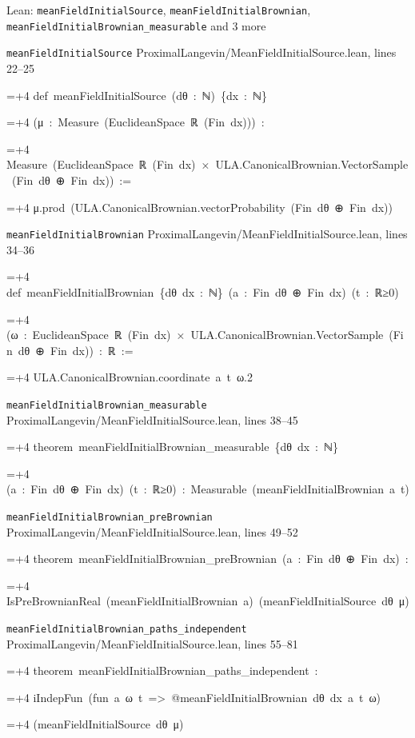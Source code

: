 \documentclass[11pt,a4paper]{report}
\newlength{\leancharwidth}
\newenvironment{leancode}{\par\smallskip\begingroup\ttfamily\footnotesize\raggedright
  \settowidth{\leancharwidth}{M}\setlength{\parskip}{0pt}\setlength{\parindent}{0pt}
  \frenchspacing}{\par\endgroup\smallskip}
\newcommand{\leanline}[2]{\hangindent=\dimexpr#1\leancharwidth+4\leancharwidth\relax
  \hangafter=1\noindent\hspace*{#1\leancharwidth}#2\par}
\newcommand{\leansource}[1]{\par{\footnotesize\color{leanmuted}#1}\par}
\begin{document}
\begin{leanbox}{Lean: \texttt{meanFieldInitialSource}, \texttt{meanFieldInitialBrownian}, \texttt{meanFieldInitialBrownian\_\allowbreak{}measurable} and 3 more}
\leansource{\texttt{meanFieldInitialSource} \quad ProximalLangevin/\allowbreak{}MeanFieldInitialSource.lean, lines 22–25}
\begin{leancode}
\leanline{0}{def\ meanFieldInitialSource\ (dθ\ :\ ℕ)\ \{dx\ :\ ℕ\}}
\leanline{4}{(μ\ :\ Measure\ (EuclideanSpace\ ℝ\ (Fin\ dx)))\ :}
\leanline{4}{Measure\ (EuclideanSpace\ ℝ\ (Fin\ dx)\ ×\ ULA.CanonicalBrownian.VectorSample\ (Fin\ dθ\ ⊕\ Fin\ dx))\ :=}
\leanline{2}{μ.prod\ (ULA.CanonicalBrownian.vectorProbability\ (Fin\ dθ\ ⊕\ Fin\ dx))}
\end{leancode}
\leansource{\texttt{meanFieldInitialBrownian} \quad ProximalLangevin/\allowbreak{}MeanFieldInitialSource.lean, lines 34–36}
\begin{leancode}
\leanline{0}{def\ meanFieldInitialBrownian\ \{dθ\ dx\ :\ ℕ\}\ (a\ :\ Fin\ dθ\ ⊕\ Fin\ dx)\ (t\ :\ ℝ≥0)}
\leanline{4}{(ω\ :\ EuclideanSpace\ ℝ\ (Fin\ dx)\ ×\ ULA.CanonicalBrownian.VectorSample\ (Fin\ dθ\ ⊕\ Fin\ dx))\ :\ ℝ\ :=}
\leanline{2}{ULA.CanonicalBrownian.coordinate\ a\ t\ ω.2}
\end{leancode}
\leansource{\texttt{meanFieldInitialBrownian\_\allowbreak{}measurable} \quad ProximalLangevin/\allowbreak{}MeanFieldInitialSource.lean, lines 38–45}
\begin{leancode}
\leanline{0}{theorem\ meanFieldInitialBrownian\_measurable\ \{dθ\ dx\ :\ ℕ\}}
\leanline{4}{(a\ :\ Fin\ dθ\ ⊕\ Fin\ dx)\ (t\ :\ ℝ≥0)\ :\ Measurable\ (meanFieldInitialBrownian\ a\ t)}
\end{leancode}
\leansource{\texttt{meanFieldInitialBrownian\_\allowbreak{}preBrownian} \quad ProximalLangevin/\allowbreak{}MeanFieldInitialSource.lean, lines 49–52}
\begin{leancode}
\leanline{0}{theorem\ meanFieldInitialBrownian\_preBrownian\ (a\ :\ Fin\ dθ\ ⊕\ Fin\ dx)\ :}
\leanline{4}{IsPreBrownianReal\ (meanFieldInitialBrownian\ a)\ (meanFieldInitialSource\ dθ\ μ)}
\end{leancode}
\leansource{\texttt{meanFieldInitialBrownian\_\allowbreak{}paths\_\allowbreak{}independent} \quad ProximalLangevin/\allowbreak{}MeanFieldInitialSource.lean, lines 55–81}
\begin{leancode}
\leanline{0}{theorem\ meanFieldInitialBrownian\_paths\_independent\ :}
\leanline{4}{iIndepFun\ (fun\ a\ ω\ t\ =>\ @meanFieldInitialBrownian\ dθ\ dx\ a\ t\ ω)}
\leanline{6}{(meanFieldInitialSource\ dθ\ μ)}

\end{leancode}
\end{leanbox}
\end{document}
